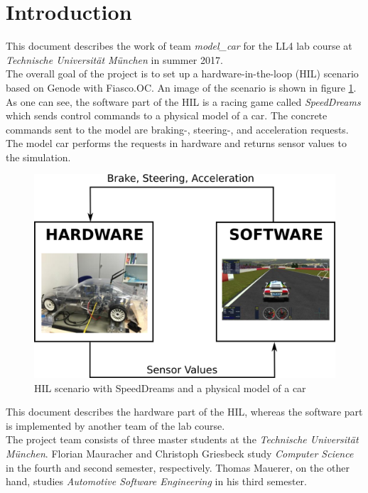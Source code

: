 \section{Introduction}
\label{sec:intro}
This document describes the work of team \textit{model\_car} for the LL4 lab course at \textit{Technische Universität München} in summer 2017. \\

The overall goal of the project is to set up a hardware-in-the-loop (HIL) scenario based on Genode with Fiasco.OC. An image of the scenario is shown in figure \ref{fig:hil}. As one can see, the software part of the HIL is a racing game called \textit{SpeedDreams} which sends control commands to a physical model of a car. The concrete commands sent to the model are braking-, steering-, and acceleration requests. The model car performs the requests in hardware and returns sensor values to the simulation. \\

\begin{figure}[h]
    \centering
    \includegraphics[width=0.7\linewidth]{images/hil}
    \caption{HIL scenario with SpeedDreams and a physical model of a car}
    \label{fig:hil}
\end{figure}

This document describes the hardware part of the HIL, whereas the software part is implemented by another team of the lab course. \\

The project team consists of three master students at the \textit{Technische Universität München}. Florian Mauracher and Christoph Griesbeck study \textit{Computer Science} in the fourth and second semester, respectively. Thomas Mauerer, on the other hand, studies \textit{Automotive Software Engineering} in his third semester.
